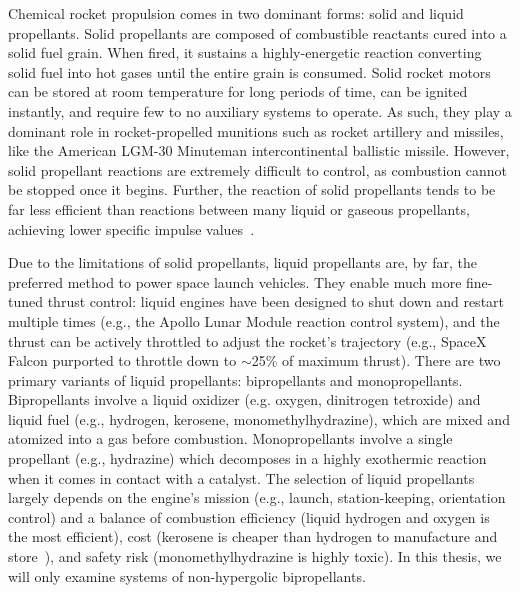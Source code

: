 Chemical rocket propulsion comes in two dominant forms: solid and liquid propellants. Solid propellants are composed of combustible reactants cured into a solid fuel grain. When fired, it sustains a highly-energetic reaction converting solid fuel into hot gases until the entire grain is consumed. Solid rocket motors can be stored at room temperature for long periods of time, can be ignited instantly, and require few to no auxiliary systems to operate. As such, they play a dominant role in rocket-propelled munitions such as rocket artillery and missiles, like the American LGM-30 Minuteman intercontinental ballistic missile. However, solid propellant reactions are extremely difficult to control, as combustion cannot be stopped once it begins. Further, the reaction of solid propellants tends to be far less efficient than reactions between many liquid or gaseous propellants, achieving lower specific impulse values~\cite{Sutton2003}.

Due to the limitations of solid propellants, liquid propellants are, by far, the preferred method to power space launch vehicles. They enable much more fine-tuned thrust control: liquid engines have been designed to shut down and restart multiple times (e.g., the Apollo Lunar Module reaction control system), and the thrust can be actively throttled to adjust the rocket's trajectory (e.g., SpaceX Falcon purported to throttle down to $\sim$25\% of maximum thrust). There are two primary variants of liquid propellants: bipropellants and monopropellants. Bipropellants involve a liquid oxidizer (e.g. oxygen, dinitrogen tetroxide) and liquid fuel (e.g., hydrogen, kerosene, monomethylhydrazine), which are mixed and atomized into a gas before combustion. Monopropellants involve a single propellant (e.g., hydrazine) which decomposes in a highly exothermic reaction when it comes in contact with a catalyst. The selection of liquid propellants largely depends on the engine's mission (e.g., launch, station-keeping, orientation control) and a balance of combustion efficiency (liquid hydrogen and oxygen is the most efficient), cost (kerosene is cheaper than hydrogen to manufacture and store~\cite{propellantCosts}), and safety risk (monomethylhydrazine is highly toxic). In this thesis, we will only examine systems of non-hypergolic bipropellants.

